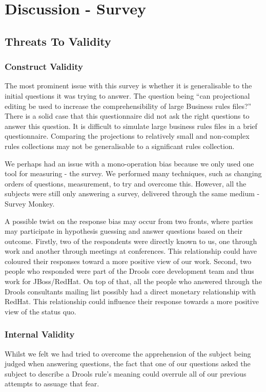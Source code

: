 \section{Discussion - Survey}
\label{section:survey_discussion}

\subsection{Threats To Validity}  

\subsubsection{Construct Validity}
The most prominent issue with this survey is whether it is generalisable to the initial questions it was trying to answer.
The question being ``can projectional editing be used to increase the comprehensibility of large Business rules files?''
There is a solid case that this questionnaire did not ask the right questions to answer this question.
It is difficult to simulate large business rules files in a brief questionnaire.
Comparing the projections to relatively small and non-complex rules collections may not be generalisable to a significant rules collection.

We perhaps had an issue with a mono-operation bias because we only used one tool for measuring - the survey.
We performed many techniques, such as changing orders of questions, measurement, to try and overcome this.
However, all the subjects were still only answering a survey, delivered through the same medium - Survey Monkey.

A possible twist on the response bias may occur from two fronts, where parties may participate in hypothesis guessing and answer questions based on their outcome.
Firstly, two of the respondents were directly known to us, one through work and another through meetings at conferences.
This relationship could have coloured their responses toward a more positive view of our work.
Second, two people who responded were part of the Drools core development team and thus work for JBoss/RedHat.
On top of that, all the people who answered through the Drools consultants mailing list possibly had a direct monetary relationship with RedHat.
This relationship could influence their response towards a more positive view of the status quo.

\subsubsection{Internal Validity}
Whilst we felt we had tried to overcome the apprehension of the subject being judged when answering questions, the fact that one of our questions asked the subject to describe a Drools rule's meaning could overrule all of our previous attempts to assuage that fear.

